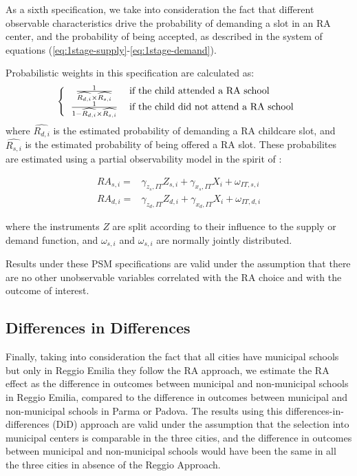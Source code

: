\documentclass[12pt]{article}
\begin{document}
\medskip

As a sixth specification, we take into consideration the fact that different observable characteristics drive the probability of demanding a slot in an RA center, and the probability of being accepted, as described in the system of equations (\ref{eq:1stage-supply}-\ref{eq:1stage-demand}).

Probabilistic weights in this specification are calculated as:
%
\[
\left\{
\begin{tabular}{cl}
$\frac{1}{ \widehat{R_{d,i}} \times \widehat{R_{s,i}}}$   & if the child attended a RA school \\
$\frac{1}{1-\widehat{R_{d,i}}  \times \widehat{R_{s,i}}}$ & if the child did not attend a RA school
\end{tabular}
\right.

\]
%
where $\widehat{R_{d,i}}$ is the estimated probability of demanding a RA childcare slot, and $\widehat{R_{s,i}}$ is the estimated probability of being offered a RA slot. These probabilites are estimated using a partial observability model in the spirit of \cite{Poirier1980}:

\begin{align*}
RA_{s,i} = & \gamma_{z_{s},IT} Z_{s,i} + \gamma_{x_{s},IT} X_{i} + \omega_{IT,s,i} \\

RA_{d,i} = & \gamma_{z_{d},IT} Z_{d,i} + \gamma_{x_{d},IT} X_{i} + \omega_{IT,d,i} 

\end{align*}

where the instruments $Z$ are split according to their influence to the supply or demand function, and $\omega_{s,i}$ and $\omega_{s,i}$ are normally jointly distributed.

Results under these PSM specifications are valid under the assumption that there are no other unobservable variables correlated with the RA choice and with the outcome of interest.

\subsection{Differences in Differences}

Finally, taking into consideration the fact that all cities have municipal schools but only in Reggio Emilia they follow the RA approach, we estimate the RA effect as the difference in outcomes between municipal and non-municipal schools in Reggio Emilia, compared to the difference in outcomes between municipal and non-municipal schools in Parma or Padova. The results using this differences-in-differences (DiD) approach are valid under the assumption that the selection into municipal centers is comparable in the three cities, and the difference in outcomes between municipal and non-municipal schools would have been the same in all the three cities in absence of the Reggio Approach.
\end{document}
